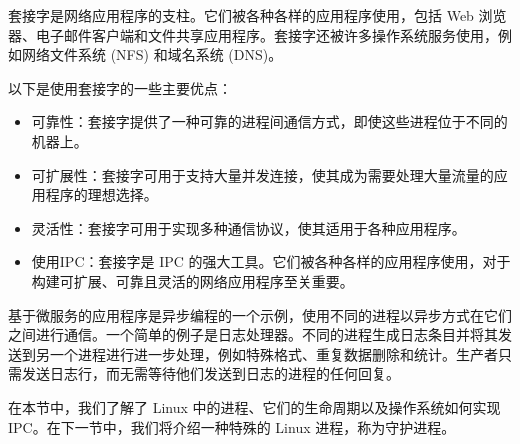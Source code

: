 \begin{itemize}
套接字是网络应用程序的支柱。它们被各种各样的应用程序使用，包括 Web 浏览器、电子邮件客户端和文件共享应用程序。套接字还被许多操作系统服务使用，例如网络文件系统 (NFS) 和域名系统 (DNS)。

以下是使用套接字的一些主要优点：

\begin{itemize}
\item
可靠性：套接字提供了一种可靠的进程间通信方式，即使这些进程位于不同的机器上。

\item
可扩展性：套接字可用于支持大量并发连接，使其成为需要处理大量流量的应用程序的理想选择。

\item
灵活性：套接字可用于实现多种通信协议，使其适用于各种应用程序。

\item
使用IPC：套接字是 IPC 的强大工具。它们被各种各样的应用程序使用，对于构建可扩展、可靠且灵活的网络应用程序至关重要。
\end{itemize}

\end{itemize}

基于微服务的应用程序是异步编程的一个示例，使用不同的进程以异步方式在它们之间进行通信。一个简单的例子是日志处理器。不同的进程生成日志条目并将其发送到另一个进程进行进一步处理，例如特殊格式、重复数据删除和统计。生产者只需发送日志行，而无需等待他们发送到日志的进程的任何回复。

在本节中，我们了解了 Linux 中的进程、它们的生命周期以及操作系统如何实现 IPC。在下一节中，我们将介绍一种特殊的 Linux 进程，称为守护进程。































